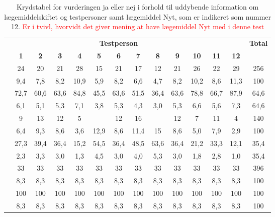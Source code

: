 \begin{table}[H]
\caption{Krydstabel for vurderingen ja eller nej i forhold til uddybende information om lægemiddelskiftet og testpersoner samt lægemiddel Nyt, som er indikeret som nummer 12. \textcolor{red}{Er i tvivl, hvorvidt det giver mening at have lægemiddel Nyt med i denne test}}
\vspace{2mm}
\label{table:test1}
\centering
\begin{tabular}{l|c|c|c|c|c|c|c|c|c|c|c|c|c}
\rowcolor[HTML]{C0C0C0}
 & \multicolumn{11}{|c|}{\textbf{Testperson}} & \textbf{} & \textbf{Total}    \\
\rowcolor[HTML]{C0C0C0}  & \textbf{1}  & \textbf{2}  & \textbf{3} & \textbf{4} & \textbf{5} & \textbf{6} & \textbf{7} & \textbf{8} & \textbf{9} & \textbf{10} & \textbf{11} & \textbf{12}  & \\ 
\cellcolor[HTML]{C0C0C0}{Antal af Nej}            & 24 & 20 & 21  &  28 &  15 &  21 & 17   &  12  & 21  & 26   &  22  & 29 & 256      \\ \cline{2-13}
\cellcolor[HTML]{C0C0C0}{\% af Nej }  & 9,4 & 7,8  & 8,2 & 10,9  & 5,9  &  8,2 & 6,6  & 4,7  & 8,2 & 10,2  &  8,6 & 11,3 &  100    \\ \cline{2-13}
\cellcolor[HTML]{C0C0C0}{\% af Gruppe} & 72,7 &  60,6  & 63,6 & 84,8   & 45,5   & 63,6  & 51,5  & 36,4 & 63,6 & 78,8 & 66,7  & 87,9 & 64,6 \\ \cline{2-13}
\cellcolor[HTML]{C0C0C0}{\% af Total}  & 6,1 & 5,1 & 5,3  & 7,1 & 3,8 & 5,3  & 4,3 & 3,0  & 5,3 & 6,6  & 5,6  & 7,3 &  64,6 \\ \hline
\cellcolor[HTML]{C0C0C0}{Antal af Ja} & 9 & 13 & 12 & 5  &  \cellcolor{blue}{18} & 12  & 16  &  \cellcolor{blue}{21}  & 12 & 7  & 11 & 4 & 140    \\ \cline{2-13} \cellcolor[HTML]{C0C0C0}{\% af Ja}  & 6,4 & 9,3  & 8,6 & 3,6 & 12,9  & 8,6  & 11,4 & 15  & 8,6  & 5,0 & 7,9  & 2,9 & 100   \\ \cline{2-13}
 \cellcolor[HTML]{C0C0C0}{\% af Gruppe} & 27,3 & 39,4 & 36,4 & 15,2   & 54,5  & 36,4 & 48,5 & 63,6  & 36,4 & 21,2 & 33,3  & 12,1 & 35,4      \\ \cline{2-13}
\cellcolor[HTML]{C0C0C0}{\% af Total}  & 2,3   & 3,3 & 3,0 & 1,3 & 4,5 & 3,0 & 4,0 & 5,3 & 3,0 & 1,8 &  2,8  & 1,0 &  35,4     \\ \hline  \cellcolor[HTML]{C0C0C0}{Total}  & 33 & 33 & 33  & 33  & 33  & 33  & 33  &  33 &  33 &   33 &  33  &  33 &  396     \\ \cline{2-13}
 \cellcolor[HTML]{C0C0C0}{\% af Nej og Ja}  & 8,3    & 8,3    &  8,3  & 8,3   &  8,3  &  8,3  &  8,3  &  8,3  & 8,3   & 8,3    & 8,3    &  8,3 &  100    \\ \cline{2-13}
 \cellcolor[HTML]{C0C0C0}{\% af Gruppe} & 100   & 100   &  100 &  100 &  100 &  100 &  100 & 100  & 100  & 100   &  100  & 100 &      100 \\ \cline{2-13}
\cellcolor[HTML]{C0C0C0}{\% af Total} & 8,3    & 8,3    &  8,3  & 8,3   &  8,3  &  8,3  &  8,3  &  8,3  & 8,3   & 8,3    & 8,3    &  8,3 &  100   \\
\end{tabular}
\end{table}

